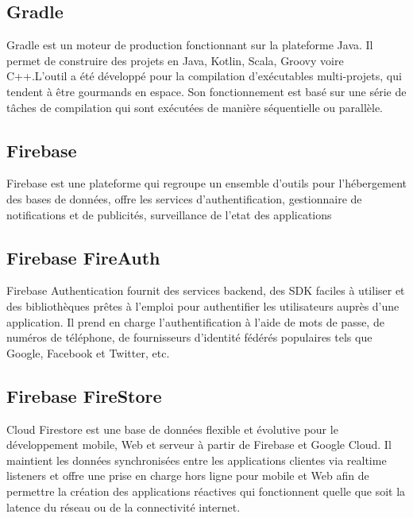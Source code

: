 \subsection{Gradle}
Gradle est un moteur de production\cite{wikipediaGradleWikipdia} fonctionnant sur la plateforme Java. Il permet de construire des projets en Java, Kotlin, Scala, Groovy voire C++.L'outil a été développé pour la compilation d'exécutables multi-projets, qui tendent à être gourmands en espace. Son fonctionnement est basé sur une série de tâches de compilation qui sont exécutées de manière séquentielle ou parallèle.
\vfill
\newpage

\subsection{Firebase}
Firebase\cite{Firebase} est une plateforme qui regroupe un ensemble d'outils pour l'hébergement des bases de données, offre les services d'authentification, gestionnaire de notifications et de publicités, surveillance de l'etat des applications

\subsection{Firebase FireAuth}
Firebase Authentication fournit des services backend, des SDK faciles à utiliser et des bibliothèques prêtes à l'emploi pour authentifier les utilisateurs auprès d'une application. Il prend en charge l'authentification à l'aide de mots de passe, de numéros de téléphone, de fournisseurs d'identité fédérés populaires tels que Google, Facebook et Twitter, etc.

\subsection{Firebase FireStore}
Cloud Firestore est une base de données flexible et évolutive pour le développement mobile, Web et serveur à partir de Firebase et Google Cloud. Il maintient les données synchronisées entre les applications clientes via realtime listeners et offre une prise en charge hors ligne pour mobile et Web afin de permettre la création des applications réactives qui fonctionnent quelle que soit la latence du réseau ou de la connectivité internet.

